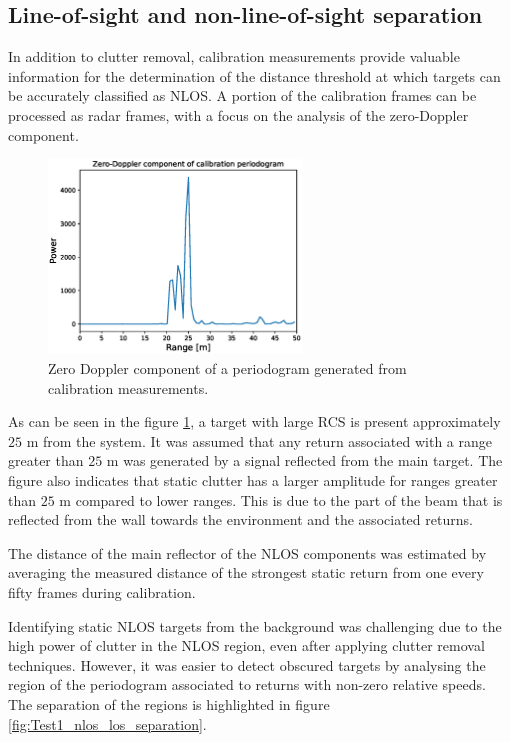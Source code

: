 \subsection{Line-of-sight and non-line-of-sight separation}

In addition to clutter removal, calibration measurements provide valuable information for the determination of the distance threshold at which targets can be accurately classified as NLOS. A portion of the calibration frames can be processed as radar frames, with a focus on the analysis of the zero-Doppler component.
	

\begin{figure}[H]
	\centering
	\includegraphics[width=0.6\textwidth]{Images/Test1/cali_static_per_t1.eps}
	\caption{Zero Doppler component of a periodogram generated from calibration measurements.}
	\label{fig:Test1_cali_static_per}
\end{figure}

As can be seen in the figure \ref{fig:Test1_cali_static_per}, a target with large RCS is present approximately $25$ m from the system. It was assumed that any return associated with a range greater than $25$ m was generated by a signal reflected from the main target. The figure also indicates that static clutter has a larger amplitude for ranges greater than $25$ m compared to lower ranges. This is due to the part of the beam that is reflected from the wall towards the environment and the associated returns.

The distance of the main reflector of the NLOS components was estimated by averaging the measured distance of the strongest static return from one every fifty frames during calibration.

Identifying static NLOS targets from the background was challenging due to the high power of clutter in the NLOS region, even after applying clutter removal techniques. However, it was easier to detect obscured targets by analysing the region of the periodogram associated to returns with non-zero relative speeds. The separation of the regions is highlighted in figure \ref{fig:Test1_nlos_los_separation}.

